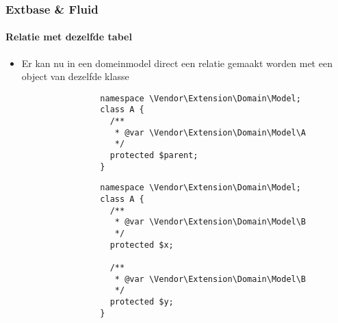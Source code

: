 \begin{frame}[fragile]
	\frametitle{Extbase \& Fluid}
	\framesubtitle{Relatie met dezelfde tabel}

	\lstset{basicstyle=\tiny\ttfamily}

	\begin{itemize}

		\item Er kan nu in een domeinmodel direct een relatie gemaakt worden met een object van dezelfde klasse

			\begin{lstlisting}
				namespace \Vendor\Extension\Domain\Model;
				class A {
				  /**
				   * @var \Vendor\Extension\Domain\Model\A
				   */
				  protected $parent;
				}
			\end{lstlisting}

			\begin{lstlisting}
				namespace \Vendor\Extension\Domain\Model;
				class A {
				  /**
				   * @var \Vendor\Extension\Domain\Model\B
				   */
				  protected $x;

				  /**
				   * @var \Vendor\Extension\Domain\Model\B
				   */
				  protected $y;
				}
			\end{lstlisting}

	\end{itemize}

\end{frame}


